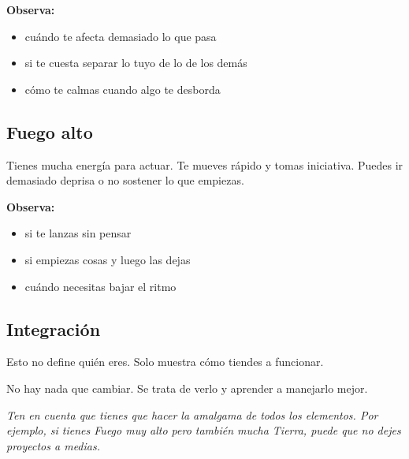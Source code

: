 \documentclass[11pt,a4paper]{article}
\begin{document}
\textbf{Observa:}
\begin{itemize}
\item cuándo te afecta demasiado lo que pasa
\item si te cuesta separar lo tuyo de lo de los demás
\item cómo te calmas cuando algo te desborda
\end{itemize}

\vspace{0.4cm}

\subsection{Fuego alto}

Tienes mucha energía para actuar. Te mueves rápido y tomas iniciativa. Puedes ir demasiado deprisa o no sostener lo que empiezas.

\textbf{Observa:}
\begin{itemize}
\item si te lanzas sin pensar
\item si empiezas cosas y luego las dejas
\item cuándo necesitas bajar el ritmo
\end{itemize}

\vspace{0.4cm}

\subsection{Integración}

Esto no define quién eres. Solo muestra cómo tiendes a funcionar.

No hay nada que cambiar. Se trata de verlo y aprender a manejarlo mejor.

\vspace{0.4cm}

\begin{center}
{\small\itshape
Ten en cuenta que tienes que hacer la amalgama de todos los elementos. Por ejemplo, si tienes Fuego muy alto pero también mucha Tierra, puede que no dejes proyectos a medias.
}
\end{center}


\vspace{0.8cm}


\end{document}
